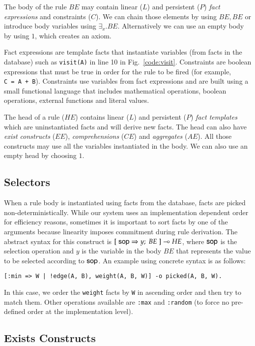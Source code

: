 The body of the rule $BE$ may contain linear ($L$) and persistent ($P$) \emph{fact expressions} and
constraints ($C$). We can chain those elements by using $BE, BE$ or introduce body variables using $\exists_{x}. BE$.
Alternatively we can use an empty body by using $1$, which creates an axiom.

Fact expressions are template facts that instantiate variables
(from facts in the database) such as \texttt{visit(A)} in line 10 in Fig.~\ref{code:visit}.
Constraints are boolean expressions that must
be true in order for the rule to be fired (for example, \texttt{C~=~A~+~B}). Constraints use variables from fact expressions and are built using a small functional language that includes mathematical operations, boolean operations, external functions and literal values.

The head of a rule ($HE$) contains linear ($L$) and persistent ($P$) \emph{fact templates} which are uninstantiated facts and will derive new facts. The head can also have \emph{exist constructs} ($EE$), \emph{comprehensions} ($CE$) and \emph{aggregates} ($AE$). All those constructs
may use all the variables instantiated in the body. We can also use an empty head by choosing $1$.

\subsection{Selectors}

When a rule body is instantiated using facts from the database, facts are picked
non-deterministically. While our system uses an implementation dependent order for
efficiency reasons, sometimes it is important to sort facts by one of the arguments
because linearity imposes commitment during rule derivation. The abstract syntax for
this construct is $[\; \mathsf{sop} \Rightarrow y; \; BE \;] \multimap HE$, where
$\mathsf{sop}$ is the selection operation and $y$ is the variable in the body $BE$ that
represents the value to be selected according to $\mathsf{sop}$.
An example using concrete syntax is as follows:

\begin{Verbatim}
[:min => W | !edge(A, B), weight(A, B, W)] -o picked(A, B, W).
\end{Verbatim}

In this case, we order the \texttt{weight} facts by \texttt{W} in ascending order and then try
to match them. Other operations available are \texttt{:max} and \texttt{:random} (to force no pre-defined order at the
implementation level).

\subsection{Exists Constructs}

